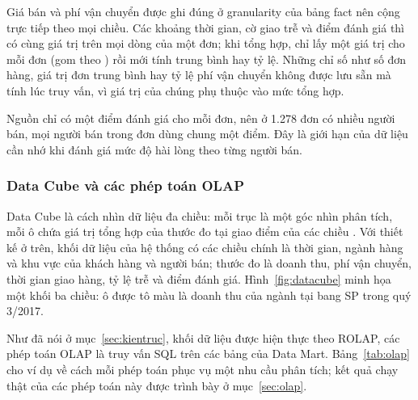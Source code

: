 Giá bán và phí vận chuyển được ghi đúng ở granularity của bảng fact nên cộng trực tiếp theo mọi chiều. Các khoảng thời gian, cờ giao trễ và điểm đánh giá thì có cùng giá trị trên mọi dòng của một đơn; khi tổng hợp, chỉ lấy một giá trị cho mỗi đơn (gom theo ) rồi mới tính trung bình hay tỷ lệ. Những chỉ số như số đơn hàng, giá trị đơn trung bình hay tỷ lệ phí vận chuyển không được lưu sẵn mà tính lúc truy vấn, vì giá trị của chúng phụ thuộc vào mức tổng hợp.

Nguồn chỉ có một điểm đánh giá cho mỗi đơn, nên ở 1.278 đơn có nhiều người bán, mọi người bán trong đơn dùng chung một điểm. Đây là giới hạn của dữ liệu cần nhớ khi đánh giá mức độ hài lòng theo từng người bán.

\subsubsection{Data Cube và các phép toán OLAP}\label{sec:datacube}

Data Cube là cách nhìn dữ liệu đa chiều: mỗi trục là một góc nhìn phân tích, mỗi ô chứa giá trị tổng hợp của thước đo tại giao điểm của các chiều \cite{han}. Với thiết kế ở trên, khối dữ liệu của hệ thống có các chiều chính là thời gian, ngành hàng và khu vực của khách hàng và người bán; thước đo là doanh thu, phí vận chuyển, thời gian giao hàng, tỷ lệ trễ và điểm đánh giá. Hình~\ref{fig:datacube} minh họa một khối ba chiều: ô được tô màu là doanh thu của ngành  tại bang SP trong quý 3/2017.



Như đã nói ở mục~\ref{sec:kientruc}, khối dữ liệu được hiện thực theo ROLAP, các phép toán OLAP là truy vấn SQL trên các bảng của Data Mart. Bảng~\ref{tab:olap} cho ví dụ về cách mỗi phép toán phục vụ một nhu cầu phân tích; kết quả chạy thật của các phép toán này được trình bày ở mục~\ref{sec:olap}.

